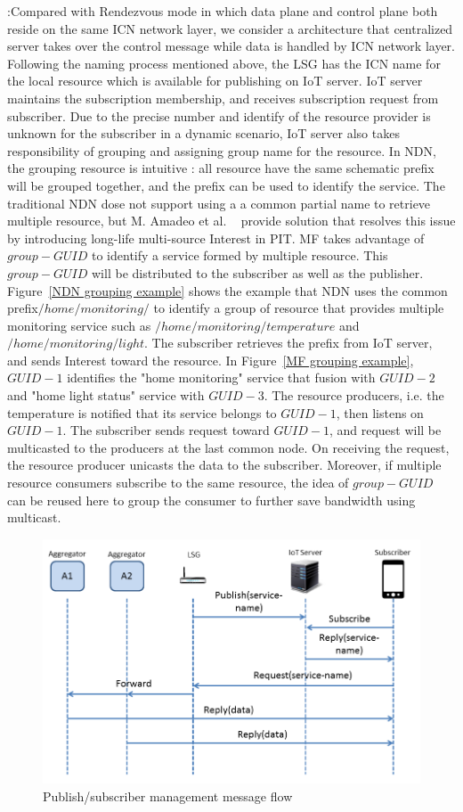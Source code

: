\vspace{1mm}:Compared with Rendezvous mode in which data plane and control plane both reside on the same ICN network layer, we consider a architecture that centralized server takes over the control message while data is handled by ICN network layer. Following the naming process mentioned above, the LSG has the ICN name for the local resource which is available for publishing on IoT server. IoT server maintains the subscription membership, and receives subscription request from subscriber. Due to the precise number and identify of the resource provider is unknown for the subscriber in a dynamic scenario, IoT server also takes responsibility of grouping and assigning group name for the resource.
In NDN, the grouping resource is intuitive : all resource have the same schematic prefix will be grouped together, and the prefix can be used to identify the service. The traditional NDN dose not support using a a common partial name to retrieve multiple resource, but M. Amadeo et al. ~\cite{**Multi-source paper**} provide solution that resolves this issue by introducing long-life multi-source Interest in PIT.
MF takes advantage of  $group-GUID$ to identify a service formed by multiple resource. This $group-GUID$ will be distributed to the subscriber as well as the publisher. Figure~\ref{NDN grouping example} shows the example that NDN uses the common prefix$/home/monitoring/$ to identify a group of resource that provides multiple monitoring service such as $/home/monitoring/temperature$ and $/home/monitoring/light$. The subscriber retrieves the prefix from IoT server, and sends Interest toward the resource. In Figure~\ref{MF grouping example}, $GUID-1$ identifies the "home monitoring" service that fusion with $GUID-2$ and "home light status" service with $GUID-3$. The resource producers, i.e. the temperature is notified that its service belongs to $GUID-1$, then listens on $GUID-1$. The subscriber sends request toward  $GUID-1$, and request will be multicasted to the producers at the last common node. On receiving the request, the resource producer unicasts the data to the subscriber. Moreover, if multiple resource consumers subscribe to the same resource,
the idea of $group-GUID$ can be reused here to group the consumer to further save bandwidth using multicast.
\begin{figure}
\includegraphics[width=\columnwidth]{figure/pub_sub.png}
\caption{\label{fig:pubsub}Publish/subscriber management message flow}
\end{figure}
